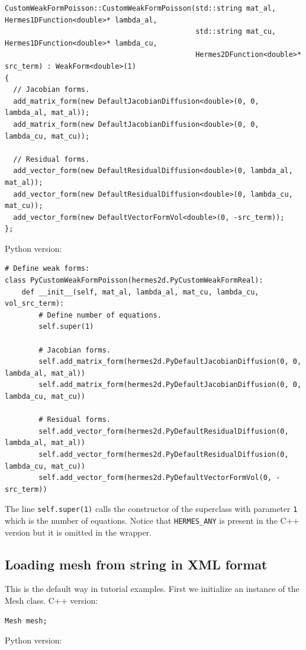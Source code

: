 \documentclass{article}
\begin{document}
{\small
\begin{verbatim}
CustomWeakFormPoisson::CustomWeakFormPoisson(std::string mat_al, Hermes1DFunction<double>* lambda_al,
                                             std::string mat_cu, Hermes1DFunction<double>* lambda_cu,
                                             Hermes2DFunction<double>* src_term) : WeakForm<double>(1)
{
  // Jacobian forms.
  add_matrix_form(new DefaultJacobianDiffusion<double>(0, 0, lambda_al, mat_al));
  add_matrix_form(new DefaultJacobianDiffusion<double>(0, 0, lambda_cu, mat_cu));

  // Residual forms.
  add_vector_form(new DefaultResidualDiffusion<double>(0, lambda_al, mat_al));
  add_vector_form(new DefaultResidualDiffusion<double>(0, lambda_cu, mat_cu));
  add_vector_form(new DefaultVectorFormVol<double>(0, -src_term));
};

\end{verbatim}
}
\noindent
Python version:
{\small
\begin{verbatim}
# Define weak forms:
class PyCustomWeakFormPoisson(hermes2d.PyCustomWeakFormReal):
    def __init__(self, mat_al, lambda_al, mat_cu, lambda_cu, vol_src_term):
        # Define number of equations.
        self.super(1)

        # Jacobian forms.
        self.add_matrix_form(hermes2d.PyDefaultJacobianDiffusion(0, 0, lambda_al, mat_al))
        self.add_matrix_form(hermes2d.PyDefaultJacobianDiffusion(0, 0, lambda_cu, mat_cu))

        # Residual forms.
        self.add_vector_form(hermes2d.PyDefaultResidualDiffusion(0, lambda_al, mat_al))
        self.add_vector_form(hermes2d.PyDefaultResidualDiffusion(0, lambda_cu, mat_cu))
        self.add_vector_form(hermes2d.PyDefaultVectorFormVol(0, -src_term))
\end{verbatim}
}
\noindent
The line {\tt self.super(1)} calls the constructor of the superclass with parameter 
{\tt 1} which is the number of equations. Notice that {\tt HERMES\_ANY} is present 
in the C++ version but it is omitted in the wrapper. 

\subsection*{Loading mesh from string in XML format}

This is the default way in tutorial examples. First we initialize 
an instance of the Mesh class. C++ version:

{\small
\begin{verbatim}
Mesh mesh;
\end{verbatim}
}
\noindent
Python version:
\end{document}
